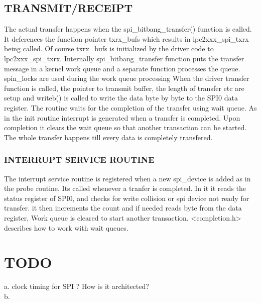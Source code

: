 \documentclass{book}
\begin{document}
\subsection{TRANSMIT/RECEIPT}
The actual transfer happens when the spi\_bitbang\_transfer() function is called. It deferences the function pointer txrx\_bufs which results in lpc2xxx\_spi\_txrx being called. Of course txrx\_bufs is initialized by the driver code to lpc2xxx\_spi\_txrx.
Internally spi\_bitbang\_transfer function puts the transfer message in a kernel work queue and a separate function processes the queue. spin\_locks are used during the work queue processing  When the driver transfer function is called, the pointer to transmit buffer, the length of transfer etc are setup and writeb() is called to write the data byte by byte to the SPI0 data register. The routine waits for the completion of the transfer using wait queue. As in the init routine interrupt is generated when a transfer is completed. Upon completion it clears the wait queue so that another transaction can be started. The whole transfer happens till every data is completely transfered. 

\subsubsection{INTERRUPT SERVICE ROUTINE}
The interrupt service routine is registered when a new spi\_device is added as in the probe routine. Its called whenever a tranfer is completed. In it it reads the status register of SPI0, and checks for write collision or spi device not ready for transfer. it then increments the count and if needed reads byte from the data register, Work queue is cleared to start another transaction. <completion.h> describes how to work with wait queues.  

\section{TODO}
a. clock timing for SPI ? How is it architected?\\
b.  
\end{document}
